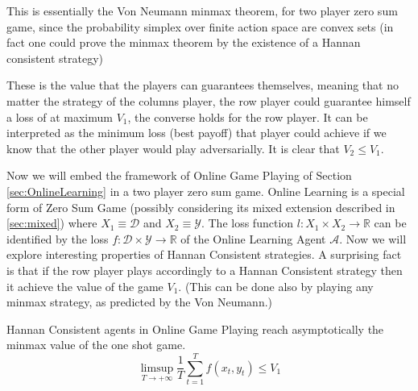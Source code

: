 This is essentially the Von Neumann minmax theorem, for two player zero sum game, since the probability simplex over finite action space are convex sets (in fact one could prove the minmax theorem by the existence of a Hannan consistent strategy)

These is the value that the players can guarantees themselves, meaning that no matter the strategy of the columns player, the row player could guarantee himself a loss of at maximum $V_1$, the converse holds for the row player. It can be interpreted as the minimum loss (best payoff) that player could achieve if we know that the other player would play adversarially. It is clear that $V_2\le V_1$.  
 
Now we will embed the framework of Online Game Playing of Section \ref{sec:OnlineLearning} in a two player zero sum game. 
Online Learning is a special form of Zero Sum Game (possibly considering its mixed extension described in \ref{sec:mixed}) where $X_1\equiv \mathcal D$ and $X_2\equiv \mathcal Y$. The loss function $l:X_1\times X_2\to\mathbb R$ can be identified by the loss $f:\mathcal D\times \mathcal Y\to\mathbb R$ of the Online Learning Agent $\mathcal A$.
Now we will explore interesting properties of Hannan Consistent strategies. A surprising fact is that if the row player plays accordingly to a Hannan Consistent strategy then it achieve the value of the game $V_1$. (This can be done also by playing any minmax strategy, as predicted by the Von Neumann.) 

\begin{theorem}
    Hannan Consistent agents in Online Game Playing reach asymptotically the minmax value of the one shot game.
    $$\limsup\limits_{T\to +\infty}\frac{1}{T}\sum\limits_{t=1}^Tf(x_t,y_t)\le V_1$$
\end{theorem}


